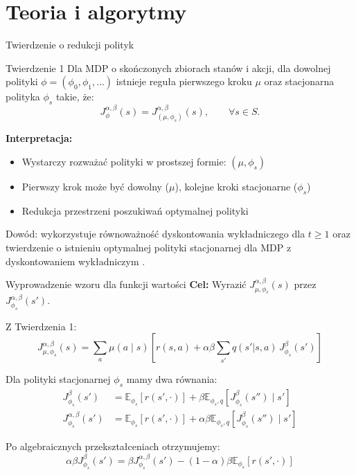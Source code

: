 \section{Teoria i algorytmy}

\begin{frame}{Twierdzenie o redukcji polityk}
\begin{block}{Twierdzenie 1 \cite{eshwar2025}}
Dla MDP o skończonych zbiorach stanów i akcji, dla dowolnej polityki $\phi = (\phi_0, \phi_1, \ldots)$ istnieje reguła pierwszego kroku $\mu$ oraz stacjonarna polityka $\phi_s$ takie, że:
\[
J_{\phi}^{\alpha,\beta}(s) = J_{(\mu,\phi_s)}^{\alpha,\beta}(s), \qquad \forall s \in S.
\]
\end{block}

\vspace{0.5em}
\textbf{Interpretacja:}
\begin{itemize}
    \item Wystarczy rozważać polityki w prostszej formie: $(\mu, \phi_s)$
    \item Pierwszy krok może być dowolny ($\mu$), kolejne kroki stacjonarne ($\phi_s$)
    \item Redukcja przestrzeni poszukiwań optymalnej polityki
\end{itemize}

\vspace{0.5em}
{\small Dowód: wykorzystuje równoważność dyskontowania wykładniczego dla $t \geq 1$ oraz twierdzenie o istnieniu optymalnej polityki stacjonarnej dla MDP z dyskontowaniem wykładniczym \cite{puterman2014,Kallenberg2022}.}
\end{frame}

\begin{frame}{Wyprowadzenie wzoru dla funkcji wartości}
\textbf{Cel:} Wyrazić $J^{\alpha, \beta}_{\mu, \phi_s}(s)$ przez $J^{\alpha, \beta}_{\phi_s}(s')$.

\vspace{0.3em}
Z Twierdzenia 1:
\begin{equation*}
J^{\alpha, \beta}_{\mu, \phi_s}(s) = \sum_a \mu(a\mid s) \left[ r(s, a) + \alpha\beta \sum_{s'} q(s'|s, a) \, J^{\beta}_{\phi_s}(s') \right]
\end{equation*}

\vspace{0.3em}
Dla polityki stacjonarnej $\phi_s$ mamy dwa równania:
\begin{align*}
J^{\beta}_{\phi_s}(s') &= \mathbb{E}_{\phi_s} [r(s', \cdot)] + \beta \mathbb{E}_{\phi_s, q} [J^{\beta}_{\phi_s}(s'') \mid s'] \\
J^{\alpha, \beta}_{\phi_s}(s') &= \mathbb{E}_{\phi_s} [r(s', \cdot)] + \alpha \beta \mathbb{E}_{\phi_s, q} [J^{\beta}_{\phi_s}(s'') \mid s']
\end{align*}

\vspace{0.3em}
Po algebraicznych przekształceniach otrzymujemy:
\begin{equation*}
\alpha \beta J^{\beta}_{\phi_s}(s') = \beta J^{\alpha, \beta}_{\phi_s}(s') - (1 - \alpha) \beta \mathbb{E}_{\phi_s} [r(s', \cdot)]
\end{equation*}
\end{frame}

